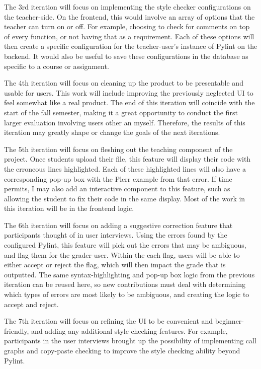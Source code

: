 \documentclass[10pt,twocolumn]{article}
\begin{document}
The 3rd iteration will focus on implementing the style checker configurations on the teacher-side. On the frontend, this would involve an array of options that the teacher can turn on or off. For example, choosing to check for comments on top of every function, or not having that as a requirement. Each of these options will then create a specific configuration for the teacher-user's instance of Pylint on the backend. It would also be useful to save these configurations in the database as specific to a course or assignment. 

The 4th iteration will focus on cleaning up the product to be presentable and usable for users. This work will include improving the previously neglected UI to feel somewhat like a real product. The end of this iteration will coincide with the start of the fall semester, making it a great opportunity to conduct the first larger evaluation involving users other an myself. Therefore, the results of this iteration may greatly shape or change the goals of the next iterations. 

The 5th iteration will focus on fleshing out the teaching component of the project. Once students upload their file, this feature will display their code with the erroneous lines highlighted. Each of these highlighted lines will also have a corresponding pop-up box with the Plerr example from that error. If time permits, I may also add an interactive component to this feature, such as allowing the student to fix their code in the same display. Most of the work in this iteration will be in the frontend logic. 

The 6th iteration will focus on adding a suggestive correction feature that participants thought of in user interviews. Using the errors found by the configured Pylint, this feature will pick out the errors that may be ambiguous, and flag them for the grader-user. Within the each flag, users will be able to either accept or reject the flag, which will then impact the grade that is outputted. The same syntax-highlighting and pop-up box logic from the previous iteration can be reused here, so new contributions must deal with determining which types of errors are most likely to be ambiguous, and creating the logic to accept and reject. 

The 7th iteration will focus on refining the UI to be convenient and beginner-friendly, and adding any additional style checking features. For example, participants in the user interviews brought up the possibility of implementing call graphs and copy-paste checking to improve the style checking ability beyond Pylint. 
\end{document}
